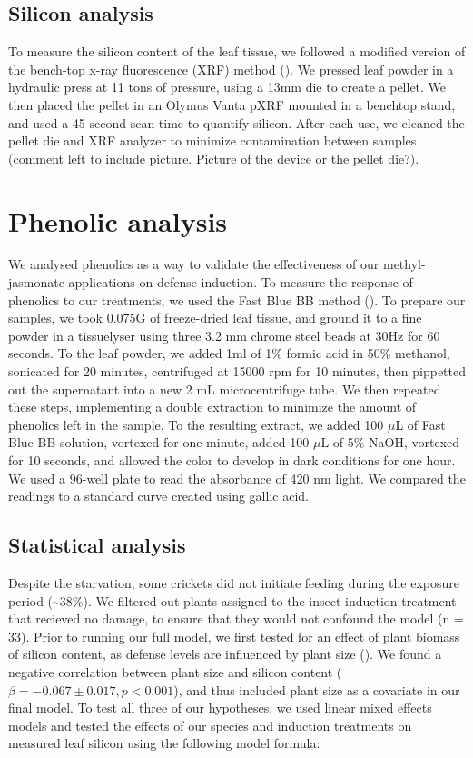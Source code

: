 \documentclass[12pt, letterpaper, ]{report}
\begin{document}
\subsection{Silicon analysis}

To measure the silicon content of the leaf tissue, we followed a modified version of the bench-top x-ray fluorescence (XRF) method (\cite{reidinger_rapid_2012}). We pressed leaf powder in a hydraulic press at 11 tons of pressure, using a 13mm die to create a pellet. We then placed the pellet in an Olymus Vanta pXRF mounted in a benchtop stand, and used a 45 second scan time to quantify silicon. After each use, we cleaned the pellet die and XRF analyzer to minimize contamination between samples (comment left to include picture. Picture of the device or the pellet die?).

\section{Phenolic analysis}

We analysed phenolics as a way to validate the effectiveness of our methyl-jasmonate applications on defense induction. To measure the response of phenolics to our treatments, we used the Fast Blue BB method (\cite{pico2020systematic}). To prepare our samples, we took 0.075G of freeze-dried leaf tissue, and ground it to a fine powder in a tissuelyser using three 3.2 mm chrome steel beads at 30Hz for 60 seconds. To the leaf powder, we added 1ml of 1\% formic acid in 50\% methanol, sonicated for 20 minutes, centrifuged at 15000 rpm for 10 minutes, then pippetted out the supernatant into a new 2 mL  microcentrifuge tube. We then repeated these steps, implementing a double extraction to minimize the amount of phenolics left in the sample. To the resulting extract, we added 100 $\mu$L of Fast Blue BB solution, vortexed for one minute, added 100 $\mu$L of 5\% NaOH, vortexed for 10 seconds, and allowed the color to develop in dark conditions for one hour. We used a 96-well plate to read the absorbance of 420 nm light. We compared the readings to a standard curve created using gallic acid. 

\subsection{Statistical analysis}

Despite the starvation, some crickets did not initiate feeding during the exposure period (\sim38\%). We filtered out plants assigned to the insect induction treatment that recieved no damage, to ensure that they would not confound the model (n = 33). Prior to running our full model, we first tested for an effect of plant biomass of silicon content, as defense levels are influenced by plant size (\cite{carmona_plant_2011}). We found a negative correlation between plant size and silicon content ($\beta = -0.067 \pm 0.017, p < 0.001$), and thus included plant size as a covariate in our final model. To test all three of our hypotheses, we used linear mixed effects models and tested the effects of our species and induction treatments on measured leaf silicon using the following model formula:
\end{document}
